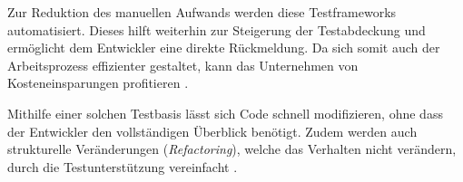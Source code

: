 Zur Reduktion des manuellen Aufwands werden diese Testframeworks automatisiert. Dieses hilft weiterhin zur Steigerung der Testabdeckung und ermöglicht dem Entwickler eine direkte Rückmeldung. Da sich somit auch der Arbeitsprozess effizienter gestaltet, kann das Unternehmen von Kosteneinsparungen profitieren \cite[S. 24]{Oppel:2025}.

Mithilfe einer solchen Testbasis lässt sich Code schnell modifizieren, ohne dass der Entwickler den vollständigen Überblick benötigt.
Zudem werden auch strukturelle Veränderungen (\textit{Refactoring}), welche das Verhalten nicht verändern, durch die Testunterstützung vereinfacht \cites[S. XVI, 5, 45]{Feathers:2013}[S. 128]{ElMorabea:2021}.   %
